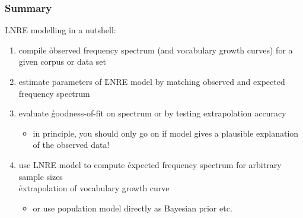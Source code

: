 \documentclass[t]{beamer} %
\begin{document}
\begin{frame}
\begin{center}
  \end{center}
\end{frame}

\begin{frame}
  \frametitle{Summary}

  LNRE modelling in a nutshell:%
  \pause
  \begin{enumerate}
  \item compile \h{observed} frequency spectrum (and vocabulary growth curves)
    for a given corpus or data set%
    \pause
  \item estimate parameters of \h{LNRE model} by matching observed and
    expected frequency spectrum%
    \pause
  \item evaluate \h{goodness-of-fit} on spectrum \citep{Baayen:01} or by
    testing extrapolation accuracy \citep{Baroni:Evert:07a}
    \begin{itemize}
      \item in principle, you should only go on if model gives a plausible
        explanation of the observed data!
    \end{itemize}
    \pause
  \item use LNRE model to compute \h{expected} frequency spectrum for
    arbitrary sample sizes\\
    \so \h{extrapolation} of vocabulary growth curve
    \begin{itemize}
    \item or use population model directly as Bayesian prior etc.
    \end{itemize}
  \end{enumerate}
\end{frame}
\end{document}
